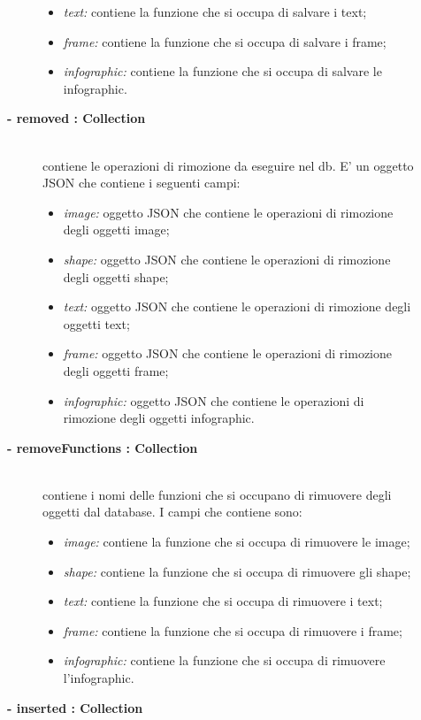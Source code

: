 \begin{description}
\begin{description}
\begin{itemize}
				\item \textit{text:} contiene la funzione che si occupa di salvare i text;
				\item \textit{frame:} contiene la funzione che si occupa di salvare i frame;
				\item \textit{infographic:} contiene la funzione che si occupa di salvare le infographic.
			\end{itemize}		
	\item[\textbf{- removed : Collection			}] \hfill \\
			contiene le operazioni di rimozione da eseguire nel db. E' un oggetto JSON che contiene i seguenti campi:
			\begin{itemize}
				\item \textit{image:} oggetto JSON che contiene le operazioni di rimozione degli oggetti image;
				\item \textit{shape:} oggetto JSON che contiene le operazioni di rimozione degli oggetti shape;
				\item \textit{text:} oggetto JSON che contiene le operazioni di rimozione degli oggetti text;
				\item \textit{frame:} oggetto JSON che contiene le operazioni di rimozione degli oggetti frame;
				\item \textit{infographic:} oggetto JSON che contiene le operazioni di rimozione degli oggetti infographic.
			\end{itemize}		
	\item[\textbf{- removeFunctions : Collection			}] \hfill \\
			contiene i nomi delle funzioni che si occupano di rimuovere degli oggetti dal database. I campi che contiene sono:
			\begin{itemize}
				\item \textit{image:} contiene la funzione che si occupa di rimuovere le image;
				\item \textit{shape:} contiene la funzione che si occupa di rimuovere gli shape;
				\item \textit{text:} contiene la funzione che si occupa di rimuovere i text;
				\item \textit{frame:} contiene la funzione che si occupa di rimuovere i frame;
				\item \textit{infographic:} contiene la funzione che si occupa di rimuovere l'infographic.
			\end{itemize}		
	\item[\textbf{- inserted : Collection			}] \hfill \\

\end{description}
\end{description}

